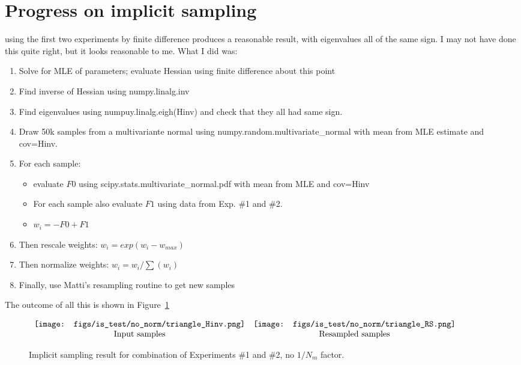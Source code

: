 \documentclass{tufte-handout}
\begin{document}
\section{Progress on implicit sampling}
 using the first
two experiments by finite difference produces a reasonable result, with
eigenvalues all of the same sign. I may not have done this quite right, but it looks reasonable to me. What I did was:
\begin{enumerate}
    \item Solve for MLE of parameters; evaluate Hessian using finite difference about this point
    \item Find inverse of Hessian using numpy.linalg.inv
    \item Find eigenvalues using numpuy.linalg.eigh(Hinv) and check that they all had same sign. 
    \item Draw 50k samples from a multivariante normal using numpy.random.multivariate\_normal with mean from MLE estimate and cov=Hinv. 
    \item For each sample:
        \begin{itemize}
           \item evaluate $F0$ using scipy.stats.multivariate\_normal.pdf with mean from MLE and cov=Hinv
           \item For each sample also evaluate $F1$ using data from Exp. \#1 and \#2.
           \item $w_i = -F0 + F1$
       \end{itemize}
   \item Then rescale weights: $w_i = exp(w_i - w_{max})$
   \item Then normalize weights: $w_i = w_i/\sum(w_i)$
    \item Finally, use Matti's resampling routine to get new samples
\end{enumerate}
The outcome of all this is shown in Figure~\ref{fig:is}
\begin{figure}
$\begin{array}{c c}
    \texttt{[image: figs/is\_test/no\_norm/triangle\_Hinv.png]}
    & \texttt{[image: figs/is\_test/no\_norm/triangle\_RS.png]}\\
    \text{Input samples} & \text{Resampled samples} \\
\end{array}$
\caption{Implicit sampling result for combination of Experiments \#1 and \#2, no $1/N_m$ factor.}
  \label{fig:is}
\end{figure}
\end{document}
